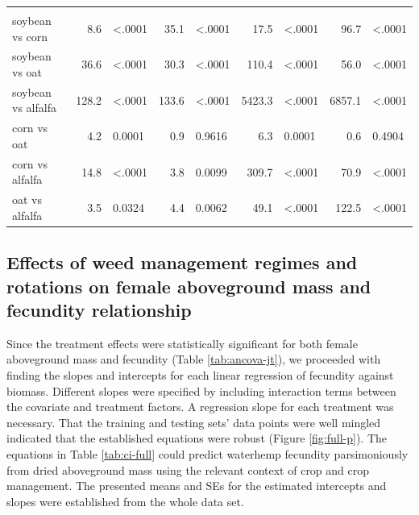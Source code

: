 \documentclass[
]{article}
\begin{document}
\begin{landscape}
\begin{table}
\begin{tabular}[t]{lrlr>{}l|rlrl}
\addlinespace[0.3em]
\multicolumn{9}{l}{\textbf{(B) - Crop species effects}}\\
\hspace{1em}soybean vs corn & 8.6 & <.0001 & 35.1 & <.0001 & 17.5 & <.0001 & 96.7 & <.0001\\
\hspace{1em}soybean vs oat & 36.6 & <.0001 & 30.3 & <.0001 & 110.4 & <.0001 & 56.0 & <.0001\\
\hspace{1em}soybean vs alfalfa & 128.2 & <.0001 & 133.6 & <.0001 & 5423.3 & <.0001 & 6857.1 & <.0001\\
\hspace{1em}corn vs oat & 4.2 & 0.0001 & 0.9 & 0.9616 & 6.3 & 0.0001 & 0.6 & 0.4904\\
\hspace{1em}corn vs alfalfa & 14.8 & <.0001 & 3.8 & 0.0099 & 309.7 & <.0001 & 70.9 & <.0001\\
\hspace{1em}oat vs alfalfa & 3.5 & 0.0324 & 4.4 & 0.0062 & 49.1 & <.0001 & 122.5 & <.0001\\
\bottomrule
\end{tabular}
\end{table}
\end{landscape}

\hypertarget{effects-of-weed-management-regimes-and-rotations-on-female-aboveground-mass-and-fecundity-relationship}{%
\subsection*{Effects of weed management regimes and rotations on female aboveground mass and fecundity relationship}\label{effects-of-weed-management-regimes-and-rotations-on-female-aboveground-mass-and-fecundity-relationship}}

Since the treatment effects were statistically significant for both female aboveground mass and fecundity (Table \ref{tab:ancova-jt}), we proceeded with finding the slopes and intercepts for each linear regression of fecundity against biomass. Different slopes were specified by including interaction terms between the covariate and treatment factors. A regression slope for each treatment was necessary. That the training and testing sets' data points were well mingled indicated that the established equations were robust (Figure \ref{fig:full-p}). The equations in Table \ref{tab:ci-full} could predict waterhemp fecundity parsimoniously from dried aboveground mass using the relevant context of crop and crop management. The presented means and SEs for the estimated intercepts and slopes were established from the whole data set.
\end{document}
